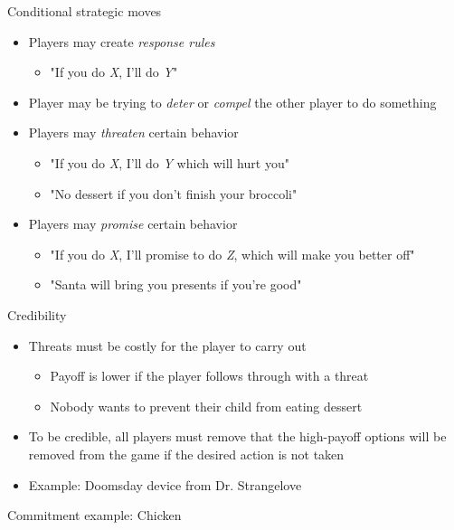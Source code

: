 \documentclass[10pt]{beamer}
\begin{document}
\begin{frame}[label={sec:org9ca6235}]{}
\alert{Conditional strategic moves}
\begin{itemize}
\item Players may create \emph{response rules}
\begin{itemize}
\item "If you do \emph{X}, I'll do \emph{Y}"
\end{itemize}
\item Player may be trying to \emph{deter} or \emph{compel} the other player to do something
\item Players may \emph{threaten} certain behavior
\begin{itemize}
\item "If you do \emph{X}, I'll do \emph{Y} which will hurt you"
\item "No dessert if you don't finish your broccoli"
\end{itemize}
\item Players may \emph{promise} certain behavior
\begin{itemize}
\item "If you do \emph{X}, I'll promise to do \emph{Z}, which will make you better off"
\item "Santa will bring you presents if you're good"
\end{itemize}
\end{itemize}
\end{frame}

\begin{frame}[label={sec:orgd4fb32f}]{}
\alert{Credibility}
\begin{itemize}
\item Threats must be costly for the player to carry out
\begin{itemize}
\item Payoff is lower if the player follows through with a threat
\item Nobody wants to prevent their child from eating dessert
\end{itemize}
\item To be credible, all players must remove that the high-payoff options will be removed from the game if the desired action is not taken
\item Example: Doomsday device from Dr. Strangelove
\end{itemize}
\end{frame}

\begin{frame}[label={sec:org63d0e9c}]{Commitment example: Chicken}
\end{frame}
\end{document}
